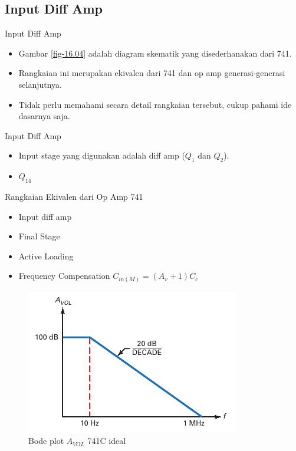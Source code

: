 \subsection{Input Diff Amp}

\begin{frame}{Input Diff Amp}
	\begin{itemize}
		\item Gambar \ref{fig-16.04} adalah diagram skematik yang disederhanakan dari 741.
		\item Rangkaian ini merupakan ekivalen dari 741 dan op amp generasi-generasi selanjutnya.
		\item Tidak perlu memahami secara detail rangkaian tersebut, cukup pahami ide dasarnya saja.
	\end{itemize}
\end{frame}

\begin{frame}{Input Diff Amp}
	\begin{itemize}
		\item Input stage yang digunakan adalah diff amp ($ Q_1 $ dan $ Q_2 $).
		\item $ Q_{14} $
	\end{itemize}
\end{frame}

\begin{frame}{Rangkaian Ekivalen dari Op Amp 741}
	\begin{itemize}
		\item Input diff amp
		\item Final Stage
		\item Active Loading
		\item Frequency Compensation $ C_{in(M)} = (A_v + 1) C_c $
	\end{itemize}
	\begin{figure}
		\centering
		\includegraphics[width=0.5\linewidth]{gambar/fig-16.05}
		\caption{Bode plot $ A_{VOL} $ 741C ideal}
		\label{fig-16.05}
	\end{figure}
\end{frame}

